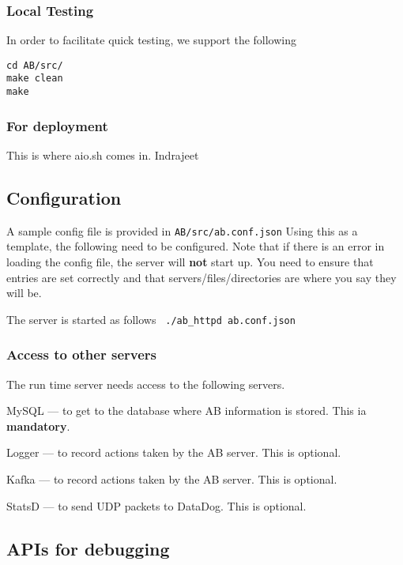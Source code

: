 \documentclass[letterpaper]{article}
\begin{document}
\subsubsection{Local Testing}
In order to facilitate quick testing, we support the following
\begin{verbatim}
cd AB/src/
make clean
make
\end{verbatim}

\subsubsection{For deployment}

This is where aio.sh comes in. Indrajeet \TBC

\subsection{Configuration}
A sample config file is provided in 
\verb+AB/src/ab.conf.json+ Using this as a template, the following need to be
configured. Note that if there is an error in loading the config file, the
server will {\bf not} start up. You need to ensure that entries are set
correctly and that servers/files/directories are where you say they will be.

The server is started as follows \verb+ ./ab_httpd ab.conf.json+

\subsubsection{Access to other servers}

The run time server needs access to the following servers. 
\be
\item MySQL --- to get to the database where AB information is stored. This ia
  {\bf mandatory}.
\item Logger --- to record actions taken by the AB server. This is optional.
\item Kafka --- to record actions taken by the AB server. This is optional.
\item StatsD --- to send UDP packets to DataDog. This is optional.
\ee

\subsection{APIs for debugging}
\end{document}
